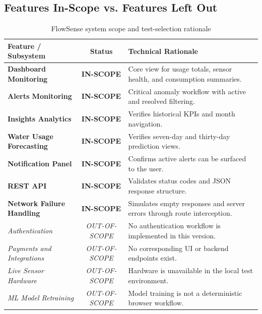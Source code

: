 \documentclass[11pt,a4paper]{article}
\begin{document}
\subsection{Features In-Scope vs. Features Left Out}

\begin{table}[H]
\centering
\small
\begin{tabularx}{\linewidth}{@{}p{3.5cm} c X@{}}
\toprule
\textbf{Feature / Subsystem} & \textbf{Status} & \textbf{Technical Rationale} \\
\midrule
\rowcolor{lightgray}
\textbf{Dashboard Monitoring} & \textbf{IN-SCOPE} & Core view for usage totals, sensor health, and consumption summaries. \\
\textbf{Alerts Monitoring} & \textbf{IN-SCOPE} & Critical anomaly workflow with active and resolved filtering. \\
\rowcolor{lightgray}
\textbf{Insights Analytics} & \textbf{IN-SCOPE} & Verifies historical KPIs and month navigation. \\
\textbf{Water Usage Forecasting} & \textbf{IN-SCOPE} & Verifies seven-day and thirty-day prediction views. \\
\rowcolor{lightgray}
\textbf{Notification Panel} & \textbf{IN-SCOPE} & Confirms active alerts can be surfaced to the user. \\
\textbf{REST API} & \textbf{IN-SCOPE} & Validates status codes and JSON response structure. \\
\rowcolor{lightgray}
\textbf{Network Failure Handling} & \textbf{IN-SCOPE} & Simulates empty responses and server errors through route interception. \\
\midrule
\textit{Authentication} & \textit{OUT-OF-SCOPE} & No authentication workflow is implemented in this version. \\
\rowcolor{lightgray}
\textit{Payments and Integrations} & \textit{OUT-OF-SCOPE} & No corresponding UI or backend endpoints exist. \\
\textit{Live Sensor Hardware} & \textit{OUT-OF-SCOPE} & Hardware is unavailable in the local test environment. \\
\rowcolor{lightgray}
\textit{ML Model Retraining} & \textit{OUT-OF-SCOPE} & Model training is not a deterministic browser workflow. \\
\bottomrule
\end{tabularx}
\caption{FlowSense system scope and test-selection rationale}
\end{table}

\newpage
\end{document}
